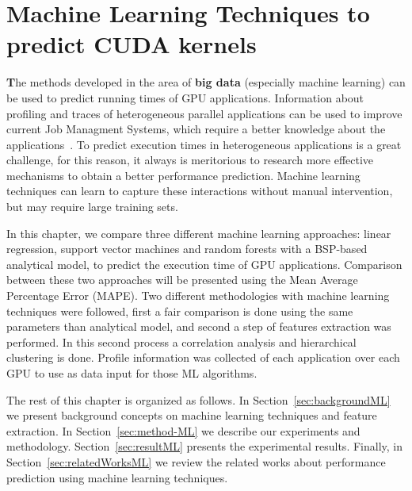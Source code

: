 \chapter{Machine Learning Techniques  to predict CUDA kernels} \label{Chap:ML}

\lettrine[findent=2pt]{\textbf{T}}{}he methods developed in the area of \textbf{big data} (especially machine learning) can be used to predict running times of GPU applications. Information about profiling and traces of heterogeneous parallel applications can be used to improve current Job Managment Systems, which require a better knowledge about the applications~\citep{JMR:Ruiz:2014}. To predict execution times in heterogeneous applications is a great challenge, for this reason, it always is meritorious to research more effective mechanisms to obtain a better performance prediction. Machine learning techniques can learn to capture these interactions without manual intervention, but may require large training sets. 

In this chapter, we compare three different machine learning approaches: linear regression, support vector machines and random forests with a BSP-based analytical model, to predict the execution time of GPU applications. Comparison between these two approaches will be presented using the Mean Average Percentage Error (MAPE). Two different methodologies with machine learning techniques were followed, first a fair comparison is done using the same parameters than analytical model, and second a step of features extraction was performed. In this second process a correlation analysis and hierarchical clustering is done. Profile information was collected of each application over each GPU to use as data input for those ML algorithms.

The rest of this chapter is organized as follows. In Section~\ref{sec:backgroundML} we present background concepts on machine learning techniques and feature extraction. In Section~\ref{sec:method-ML} we describe our experiments and methodology. Section~\ref{sec:resultML} presents the experimental results. Finally, in Section~\ref{sec:relatedWorksML} we review the related works about performance prediction using machine learning techniques.










